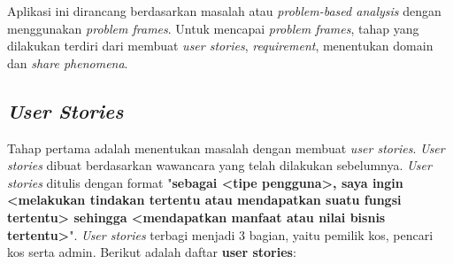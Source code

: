 	Aplikasi ini dirancang berdasarkan masalah atau \textit{problem-based analysis} dengan menggunakan \textit{problem frames}. Untuk mencapai \textit{problem frames}, tahap yang dilakukan terdiri dari membuat \textit{user stories}, \textit{requirement}, menentukan domain dan \textit{share phenomena}. 
	
	\subsection{\textit{User Stories}}
	Tahap pertama adalah menentukan masalah dengan membuat \textit{user stories}. \textit{User stories} dibuat berdasarkan wawancara yang telah dilakukan sebelumnya. \textit{User stories} ditulis dengan format "\textbf{sebagai <tipe pengguna>, saya ingin <melakukan tindakan tertentu atau mendapatkan suatu fungsi tertentu> sehingga <mendapatkan manfaat atau nilai bisnis tertentu>}". \textit{User stories }terbagi menjadi 3 bagian, yaitu pemilik kos, pencari kos serta admin. Berikut adalah daftar \textbf{user stories}:

